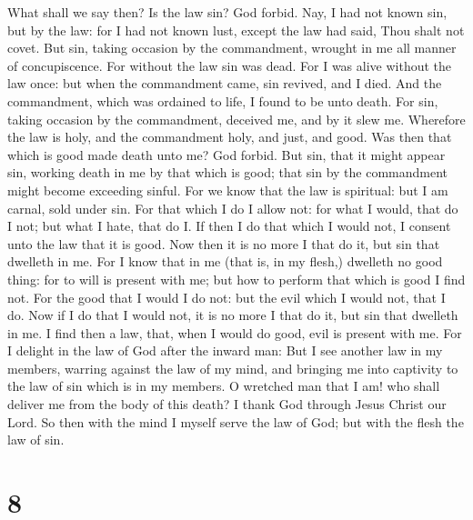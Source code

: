 What shall we say then? Is the law sin? God forbid. Nay, I
had not known sin, but by the law: for I had not known lust, except the
law had said, Thou shalt not covet.  But sin, taking
occasion by the commandment, wrought in me all manner of concupiscence.
For without the law sin was dead.  For I was alive without
the law once: but when the commandment came, sin revived, and I died.
 And the commandment, which was ordained to life, I found
to be unto death.  For sin, taking occasion by the
commandment, deceived me, and by it slew me.  Wherefore the
law is holy, and the commandment holy, and just, and good. 
Was then that which is good made death unto me? God forbid. But sin,
that it might appear sin, working death in me by that which is good;
that sin by the commandment might become exceeding sinful. 
For we know that the law is spiritual: but I am carnal, sold under sin.
 For that which I do I allow not: for what I would, that do
I not; but what I hate, that do I.  If then I do that which
I would not, I consent unto the law that it is good.  Now
then it is no more I that do it, but sin that dwelleth in me.
 For I know that in me (that is, in my flesh,) dwelleth no
good thing: for to will is present with me; but how to perform that
which is good I find not.  For the good that I would I do
not: but the evil which I would not, that I do.  Now if I
do that I would not, it is no more I that do it, but sin that dwelleth
in me.  I find then a law, that, when I would do good, evil
is present with me.  For I delight in the law of God after
the inward man:  But I see another law in my members,
warring against the law of my mind, and bringing me into captivity to
the law of sin which is in my members.  O wretched man that
I am! who shall deliver me from the body of this death?  I
thank God through Jesus Christ our Lord. So then with the mind I myself
serve the law of God; but with the flesh the law of sin.

\hypertarget{section-7}{%
\section{8}\label{section-7}}

